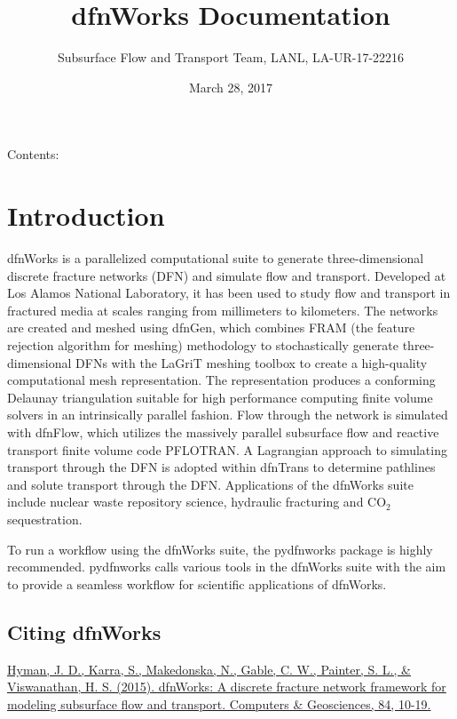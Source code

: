 \documentclass[letterpaper,10pt,english]{sphinxmanual}
\title{dfnWorks Documentation}
\date{March 28, 2017}
\author{Subsurface Flow and Transport Team, LANL, LA-UR-17-22216}
\begin{document}
\maketitle
\tableofcontents
{}\label{index::doc}


Contents:


\chapter{Introduction}
\label{intro:introduction}\label{intro:welcome-to-dfnworks-2-0-documentation}\label{intro::doc}
dfnWorks is a parallelized computational suite to generate three-dimensional
discrete fracture networks (DFN) and simulate flow and transport. Developed at
Los Alamos National Laboratory, it has been used to study flow and transport
in fractured media at scales ranging from millimeters to kilometers. The
networks are created and meshed using dfnGen, which combines FRAM (the feature
rejection algorithm for meshing) methodology to stochastically generate
three-dimensional DFNs with the LaGriT meshing toolbox to create a high-quality
computational mesh representation. The representation produces a conforming
Delaunay triangulation suitable for high performance computing finite volume
solvers in an intrinsically parallel fashion. Flow through the network is
simulated with dfnFlow, which utilizes the massively parallel subsurface flow
and reactive transport finite volume code PFLOTRAN. A Lagrangian approach to
simulating transport through the DFN is adopted within dfnTrans to determine
pathlines and solute transport through the DFN. Applications of the dfnWorks
suite include nuclear waste repository science, hydraulic fracturing and
CO$_{\text{2}}$ sequestration.

To run a workflow using the dfnWorks suite, the pydfnworks package is
highly recommended. pydfnworks calls various tools in the dfnWorks suite with
the aim to provide a seamless workflow for scientific applications of dfnWorks.


\section{Citing dfnWorks}
\label{intro:citing-dfnworks}
\href{http://www.sciencedirect.com/science/article/pii/S0098300415300261/}{Hyman, J. D., Karra, S., Makedonska, N., Gable, C. W., Painter, S. L., \&
Viswanathan, H. S. (2015). dfnWorks: A discrete fracture network framework
for modeling subsurface flow and transport. Computers \& Geosciences, 84,
10-19.}
\end{document}
